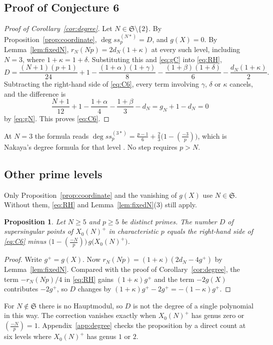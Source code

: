 \documentclass[11pt,a4paper]{article}
\newtheorem{proposition}[theorem]{Proposition}
\theoremstyle{remark}\newtheorem{remark}[theorem]{Remark}
\numberwithin{equation}{section}
\newcommand{\leg}[2]{\left(\frac{#1}{#2}\right)}
\begin{document}
	\subsection{Proof of Conjecture 6}
	\begin{proof}[Proof of Corollary~\ref{cor:degree}]
		Let $N\in\mathfrak S\setminus\{2\}$. By Proposition~\ref{prop:coordinate}, $\deg ss_p^{(N*)}=D$, and $g(X)=0$. By Lemma~\ref{lem:fixedN}, $r_N(Np)=2d_N(1+\kappa)$ at every such level, including $N=3$, where $1+\kappa=1+\delta$. Substituting this and \eqref{eq:gC} into \eqref{eq:RH},
		\[
		D=\frac{(N+1)(p+1)}{24}+1-\frac{(1+\alpha)(1+\gamma)}8-\frac{(1+\beta)(1+\delta)}6-\frac{d_N(1+\kappa)}2.
		\]
		Subtracting the right-hand side of \eqref{eq:C6}, every term involving $\gamma$, $\delta$ or $\kappa$ cancels, and the difference is
		\[
		\frac{N+1}{12}+1-\frac{1+\alpha}4-\frac{1+\beta}3-d_N=g_N+1-d_N=0
		\]
		by \eqref{eq:gN}. This proves \eqref{eq:C6}.
	\end{proof}
	
	At $N=3$ the formula reads $\deg ss_p^{(3*)}=\frac{p-1}6+\frac23\bigl(1-\leg{-3}{p}\bigr)$, which is Nakaya's degree formula for that level \cite{Nakaya}. No step requires $p>N$.
	
	\subsection{Other prime levels}
	Only Proposition~\ref{prop:coordinate} and the vanishing of $g(X)$ use $N\in\mathfrak S$. Without them, \eqref{eq:RH} and Lemma~\ref{lem:fixedN}(3) still apply.
	
	\begin{proposition}\label{prop:degree-general}
		Let $N\geq5$ and $p\geq5$ be distinct primes. The number $D$ of supersingular points of $X_0(N)^+$ in characteristic $p$ equals the right-hand side of \eqref{eq:C6} minus $\bigl(1-\leg{-N}{p}\bigr)\,g\bigl(X_0(N)^+\bigr)$.
	\end{proposition}
	\begin{proof}
		Write $g^+=g(X)$. Now $r_N(Np)=(1+\kappa)(2d_N-4g^+)$ by Lemma~\ref{lem:fixedN}. Compared with the proof of Corollary~\ref{cor:degree}, the term $-r_N(Np)/4$ in \eqref{eq:RH} gains $(1+\kappa)g^+$ and the term $-2g(X)$ contributes $-2g^+$, so $D$ changes by $(1+\kappa)g^+-2g^+=-(1-\kappa)g^+$.
	\end{proof}
	
	For $N\notin\mathfrak S$ there is no Hauptmodul, so $D$ is not the degree of a single polynomial in this way. The correction vanishes exactly when $X_0(N)^+$ has genus zero or $\leg{-N}{p}=1$. Appendix~\ref{app:degree} checks the proposition by a direct count at six levels where $X_0(N)^+$ has genus $1$ or $2$.
	
\end{document}
